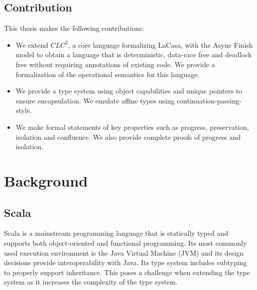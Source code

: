 \section{Contribution}
This thesis makes the following contributions:
\begin{itemize}
    \item We extend $CLC^2$, a core language formalizing LaCasa, with the Async Finish model to obtain a language that is deterministic, data-race free and deadlock free without requiring annotations of existing code. We provide a formalization of the operational semantics for this language.
    \item We provide a type system using object capabilities and unique pointers to ensure encapsulation. We emulate affine types using continuation-passing-style.
    \item We make formal statements of key properties such as progress, preservation, isolation and confluence. We also provide complete proofs of progress and isolation.
\end{itemize}


\chapter{Background}\label{bg}
\section{Scala}
Scala is a mainstream programming language that is statically typed and supports both object-oriented and functional programming. Its most commonly used execution environment is the Java Virtual Machine (JVM) and its design decisions provide interoperability with Java. Its type system includes subtyping to properly support inheritance. This poses a challenge when extending the type system as it increases the complexity of the type system.

